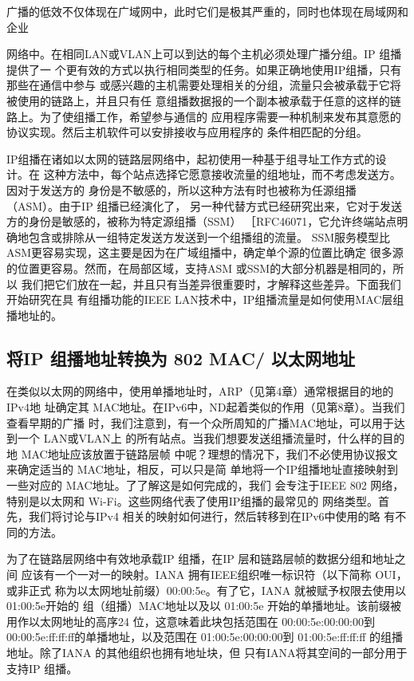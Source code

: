 广播的低效不仅体现在广域网中，此时它们是极其严重的，同时也体现在局域网和企业

网络中。在相同LAN或VLAN上可以到达的每个主机必须处理广播分组。IP 组播提供了一
个更有效的方式以执行相同类型的任务。如果正确地使用IP组播，只有那些在通信中参与
或感兴趣的主机需要处理相关的分组，流量只会被承载于它将被使用的链路上，并且只有任
意组播数据报的一个副本被承载于任意的这样的链路上。为了使组播工作，希望参与通信的
应用程序需要一种机制来发布其意愿的协议实现。然后主机软件可以安排接收与应用程序的
条件相匹配的分组。

IP组播在诸如以太网的链路层网络中，起初使用一种基于组寻址工作方式的设计。在
这种方法中，每个站点选择它愿意接收流量的组地址，而不考虑发送方。因对于发送方的
身份是不敏感的，所以这种方法有时也被称为任源组播（ASM）。由于IP 组播已经演化了，
另一种代替方式已经研究出来，它对于发送方的身份是敏感的，被称为特定源组播（SSM）
［RFC46071，它允许终端站点明确地包含或排除从一组特定发送方发送到一个组播组的流量。
SSM服务模型比 ASM更容易实现，这主要是因为在广域组播中，确定单个源的位置比确定
很多源的位置更容易。然而，在局部区域，支持ASM 或SSM的大部分机器是相同的，所以
我们把它们放在一起，并且只有当差异很重要时，才解释这些差异。下面我们开始研究在具
有组播功能的IEEE LAN技术中，IP组播流量是如何使用MAC层组播地址的。

\subsection{将IP 组播地址转换为 802 MAC/ 以太网地址}

在类似以太网的网络中，使用单播地址时，ARP（见第4章）通常根据目的地的IPv4地
址确定其 MAC地址。在IPv6中，ND起着类似的作用（见第8章）。当我们查看早期的广播
时，我们注意到，有一个众所周知的广播MAC地址，可以用于达到一个 LAN或VLAN上
的所有站点。当我们想要发送组播流量时，什么样的目的地 MAC地址应该放置于链路层帧
中呢？理想的情况下，我们不必使用协议报文来确定适当的 MAC地址，相反，可以只是简
单地将一个IP组播地址直接映射到一些对应的 MAC地址。了了解这是如何完成的，我们
会专注于IEEE 802 网络，特别是以太网和 Wi-Fi。这些网络代表了使用IP组播的最常见的
网络类型。首先，我们将讨论与IPv4 相关的映射如何进行，然后转移到在IPv6中使用的略
有不同的方法。

为了在链路层网络中有效地承载IP 组播，在IP 层和链路层帧的数据分组和地址之间
应该有一个一对一的映射。IANA 拥有IEEE组织唯一标识符（以下简称 OUI，或非正式
称为以太网地址前缀）00:00:5e。有了它，IANA 就被赋予权限去使用以01:00:5e开始的
组（组播）MAC地址以及以 01:00:5e 开始的单播地址。该前缀被用作以太网地址的高序24
位，这意味着此块包括范围在 00:00:5e:00:00:00到 00:00:5e:ff:ff:ff的单播地址，以及范围在
01:00:5e:00:00:00到 01:00:5e:ff:ff:ff 的组播地址。除了IANA 的其他组织也拥有地址块，但
只有IANA将其空间的一部分用于支持IP 组播。

